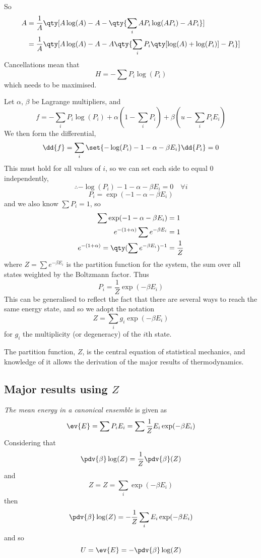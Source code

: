 So 
\begin{align*}
  A &= \frac{1}{A} \qty[ A \log(A) - A - \qty{ \sum_i A P_i \log(A P_i) - A P_i}] \\
&= \frac{1}{A} \qty[ A \log(A) - A - A \qty{ \sum_i P_i \qty[\log(A) + \log(P_i)] - P_i}]
\end{align*}
Cancellations mean that 
\[ H = - \sum P_i \log(P_i) \]
which needs to be maximised.

Let $\alpha$, $\beta$ be Lagrange multipliers, and 
\[ f = - \sum_i P_i \log(P_i) + \alpha(1 - \sum_i P_i) + \beta( u - \sum_i P_i E_i )\]
We then form the differential,
\[ \dd{f} = \sum_i \set{ - \log(P_i) - 1 - \alpha - \beta E_i}
\dd{P_i} = 0 \] This must hold for all values of $i$, so we can set
each side to equal $0$ independently,
\[ \therefore - \log(P_i) - 1 -\alpha - \beta E_i =0 \quad \forall i \]
\[ P_i = \exp( -1 -\alpha -\beta E_i) \]
and we also know $\sum P_i=1$, so
\begin{align*}
  \sum \exp(-1 -\alpha - \beta E_i) &= 1 \\
  e^{-(1+\alpha)} \sum e^{-\beta E_i} &= 1 \\
  e^{-(1+\alpha)} =  \qty(\sum e^{-\beta E_i})^{-1} &= \frac{1}{Z} 
\end{align*}
where $Z = \sum e^{-\beta E_i}$ is the partition function for the
system, the sum over all states weighted by the Boltzmann factor. Thus
\begin{equation}
  \label{eq:10}
  P_i = \frac{1}{Z} \exp(-\beta E_i)
\end{equation}
This can be generalised to reflect the fact that there are several
ways to reach the same energy state, and so we adopt the notation
\begin{equation}
  \label{eq:11}
  Z = \sum_i g_i \exp(- \beta E_i)
\end{equation}
for $g_i$ the multiplicity (or degeneracy) of the $i$th state.

The partition function, $Z$, is the central equation of statistical
mechanics, and knowledge of it allows the derivation of the major
results of thermodynamics.

\subsection{Major results using $Z$}
\label{sec:major-results-using}

\emph{The mean energy in a canonical ensemble} is given as
\[ \ev{E} = \sum P_i E_i = \sum \frac{1}{Z} E_i \exp(-\beta E_i) \]
Considering that 
\[ \pdv{\beta} \log(Z) = \frac{1}{Z} \pdv{\beta}(Z) \]
and 
\[ Z = Z = \sum_i \exp(- \beta E_i) \]
then
\[ \pdv{\beta} \log(Z) = - \frac{1}{Z} \sum_i E_i \exp(- \beta E_i) \]
and so
\begin{equation}
\label{eq:12}
 U = \ev{E} = - \pdv{\beta} \log(Z) 
\end{equation}

